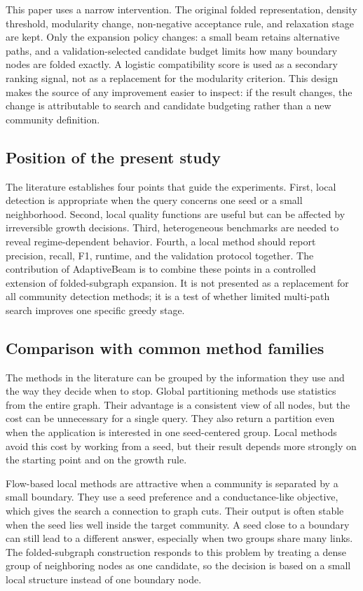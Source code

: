\documentclass[10pt,journal,compsoc]{IEEEtran}
\begin{document}
This paper uses a narrow intervention. The original folded representation,
density threshold, modularity change, non-negative acceptance rule, and
relaxation stage are kept. Only the expansion policy changes: a small beam
retains alternative paths, and a validation-selected candidate budget limits
how many boundary nodes are folded exactly. A logistic compatibility score is
used as a secondary ranking signal, not as a replacement for the modularity
criterion. This design makes the source of any improvement easier to inspect:
if the result changes, the change is attributable to search and candidate
budgeting rather than a new community definition.

\subsection{Position of the present study}
The literature establishes four points that guide the experiments. First,
local detection is appropriate when the query concerns one seed or a small
neighborhood. Second, local quality functions are useful but can be affected
by irreversible growth decisions. Third, heterogeneous benchmarks are needed
to reveal regime-dependent behavior. Fourth, a local method should report
precision, recall, F1, runtime, and the validation protocol together. The
contribution of AdaptiveBeam is to combine these points in a controlled
extension of folded-subgraph expansion. It is not presented as a replacement
for all community detection methods; it is a test of whether limited
multi-path search improves one specific greedy stage.

\subsection{Comparison with common method families}
The methods in the literature can be grouped by the information they use and
the way they decide when to stop. Global partitioning methods use statistics
from the entire graph. Their advantage is a consistent view of all nodes, but
the cost can be unnecessary for a single query. They also return a partition
even when the application is interested in one seed-centered group. Local
methods avoid this cost by working from a seed, but their result depends more
strongly on the starting point and on the growth rule.

Flow-based local methods are attractive when a community is separated by a
small boundary. They use a seed preference and a conductance-like objective,
which gives the search a connection to graph cuts. Their output is often
stable when the seed lies well inside the target community. A seed close to a
boundary can still lead to a different answer, especially when two groups
share many links. The folded-subgraph construction responds to this problem
by treating a dense group of neighboring nodes as one candidate, so the
decision is based on a small local structure instead of one boundary node.
\end{document}
